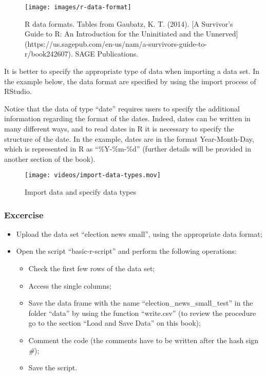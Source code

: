 \documentclass[
]{article}
\providecommand{\tightlist}{%
  \setlength{\itemsep}{0pt}\setlength{\parskip}{0pt}}
\begin{document}
\begin{figure}
\texttt{[image: images/r-data-format]} \caption{R data formats. Tables from Gaubatz, K. T. (2014). [A Survivor's Guide to R: An Introduction for the Uninitiated and the Unnerved](https://us.sagepub.com/en-us/nam/a-survivors-guide-to-r/book242607). SAGE Publications.}\label{fig:unnamed-chunk-39}
\end{figure}

It is better to specify the appropriate type of data when importing a data set. In the example below, the data format are specified by using the import process of RStudio.

Notice that the data of type ``date'' requires users to specify the additional information regarding the format of the dates. Indeed, dates can be written in many different ways, and to read dates in R it is necessary to specify the structure of the date. In the example, dates are in the format Year-Month-Day, which is represented in R as ``\%Y-\%m-\%d'' (further details will be provided in another section of the book).

\begin{figure}
\centering
\texttt{[image: videos/import-data-types.mov]}
\caption{Import data and specify data types}
\end{figure}

\subsubsection{Excercise}\label{excercise}

\begin{itemize}
\tightlist
\item
  Upload the data set ``election news small'', using the appropriate data format;
\item
  Open the script ``basic-r-script'' and perform the following operations:

  \begin{itemize}
  \tightlist
  \item
    Check the first few rows of the data set;
  \item
    Access the single columns;
  \item
    Save the data frame with the name ``election\_news\_small\_test'' in the folder ``data'' by using the function ``write.csv'' (to review the procedure go to the section ``Load and Save Data'' on this book);
  \item
    Comment the code (the comments have to be written after the hash sign \emph{\#});
  \item
    Save the script.
  \end{itemize}
\end{itemize}
\end{document}
